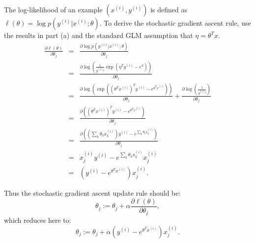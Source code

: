 \begin{answer}
The log-likelihood of an example $(x^{(i)}, y^{(i)})$ is defined as
$\ell(\theta) = \log p(y^{(i)} | x^{(i)}; \theta)$. To derive the stochastic
gradient ascent rule, use the results in part (a) and the standard GLM
assumption that $\eta = \theta^Tx$.
\begin{eqnarray*}
	\frac{\partial \ell(\theta)}{\partial \theta_j}
	&=& \frac{\partial \log p(y^{(i)} | x^{(i)}; \theta)}{\partial \theta_j}\\
	&=& \frac {\partial \log \left({\frac{1}{y^{(i)}!} \exp(\eta^T y^{(i)} -
	e^\eta)}\right)} {\partial \theta_j}\\
	&=& \frac {\partial \log \left(\exp((\theta^Tx^{(i)})^T y^{(i)} -
	e^{\theta^Tx^{(i)}})\right)} {\partial \theta_j}
	+ \frac {\partial \log \left({\frac{1}{y^{(i)}!}}\right)} {\partial
\theta_j}\\
	&=& \frac {\partial \left((\theta^Tx^{(i)})^T y^{(i)}
		- e^{\theta^Tx^{(i)}}\right)} {\partial \theta_j}\\
	&=& \frac {\partial \left((\sum_k \theta_k x^{(i)}_k) y^{(i)}
		- e^{\sum_k\theta_k x^{(i)}_k}\right)} {\partial \theta_j}\\
	&=& x^{(i)}_jy^{(i)} - e^{\sum_k \theta_k x^{(i)}_k} x^{(i)}_j\\
	&=& (y^{(i)} - e^{\theta^T x^{(i)}}) x^{(i)}_j.
\end{eqnarray*}

Thus the stochastic gradient ascent update rule should be:
%
\begin{equation*}
\theta_j := \theta_j + \alpha \frac{\partial \ell(\theta)}{\partial \theta_j},
\end{equation*}
%
which reduces here to:
\begin{equation*}
	\theta_j := \theta_j + \alpha (y^{(i)} - e^{\theta^T x^{(i)}}) x^{(i)}_j.
\end{equation*}
\end{answer}
